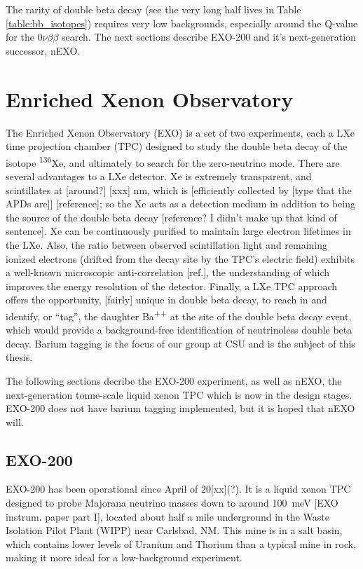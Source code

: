 The rarity of double beta decay (see the very long half lives in Table \ref{table:bb_isotopes}) requires very low backgrounds, especially around the Q-value for the $0\nu\beta\beta$ search. The next sections describe EXO-200 and it's next-generation successor, nEXO.

\section{Enriched Xenon Observatory}

The Enriched Xenon Observatory (EXO) is a set of two experiments, each a LXe time projection chamber (TPC) designed to study the double beta decay of the isotope \textsuperscript{136}Xe, and ultimately to search for the zero-neutrino mode.  There are several advantages to a LXe detector.  Xe is extremely transparent, and scintillates at [around?] [xxx] nm, which is [efficiently collected by [type that the APDs are]] [reference]; so the Xe acts as a detection medium in addition to being the source of the double beta decay [reference? I didn't make up that kind of sentence].  Xe can be continuously purified to maintain large electron lifetimes in the LXe.  Also, the ratio between observed scintillation light and remaining ionized electrons (drifted from the decay site by the TPC's electric field) exhibits a well-known microscopic anti-correlation [ref.], the understanding of which improves the energy resolution of the detector.  Finally, a LXe TPC approach offers the opportunity, [fairly] unique in double beta decay, to reach in and identify, or ``tag'', the daughter Ba\textsuperscript{++} at the site of the double beta decay event, which would provide a background-free identification of neutrinoless double beta decay. Barium tagging is the focus of our group at CSU and is the subject of this thesis.

The following sections decribe the EXO-200 experiment, as well as nEXO, the next-generation tonne-scale liquid xenon TPC which is now in the design stages.  EXO-200 does not have barium tagging implemented, but it is hoped that nEXO will. 

\subsection{EXO-200}

EXO-200 has been operational since April of 20[xx](?).  It is a liquid xenon TPC designed to probe Majorana neutrino masses down to around 100~meV [EXO instrum. paper part I], located about half a mile underground in the Waste Isolation Pilot Plant (WIPP) near Carlsbad, NM.  This mine is in a salt basin, which contains lower levels of Uranium and Thorium than a typical mine in rock, making it more ideal for a low-background experiment.

